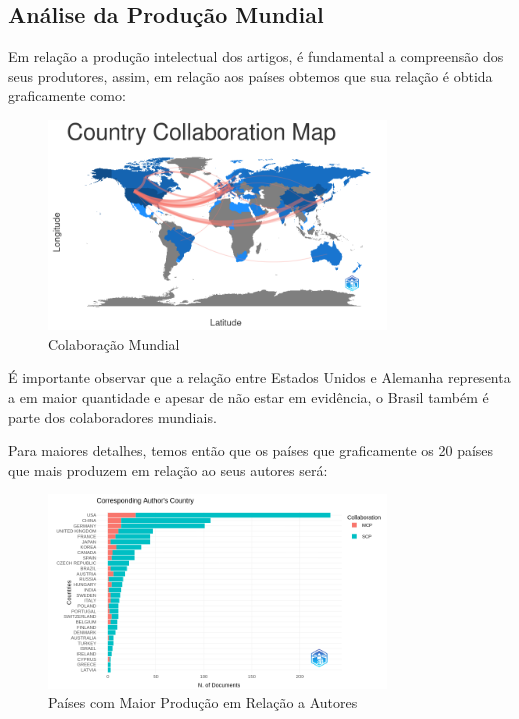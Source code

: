 \subsection{Análise da Produção Mundial}

Em relação a produção intelectual dos artigos, é fundamental a compreensão dos seus produtores, assim, em relação aos países obtemos que sua relação é obtida graficamente como:

\begin{figure}[H]
    \centering
    \includegraphics[width=0.8\textwidth]{experiments/uventura/AnaliseBibliometrica/Images/ColaboraçãoDePaíses.png}
    \caption{Colaboração Mundial}
    \label{fig:uventura:bib-country-colab}
\end{figure}

É importante observar que a relação entre Estados Unidos e Alemanha representa a em maior quantidade e apesar de não estar em evidência, o Brasil também é parte dos colaboradores mundiais.

Para maiores detalhes, temos então que os países que graficamente os 20 países que mais produzem em relação ao seus autores será:

\begin{figure}[H]
    \centering
    \includegraphics[width=0.8\textwidth]{experiments/uventura/AnaliseBibliometrica/Images/Corresponding Author's Country.png}
    \caption{Países com Maior Produção em Relação a Autores}
    \label{fig:uventura:bib-country-product}
\end{figure}

